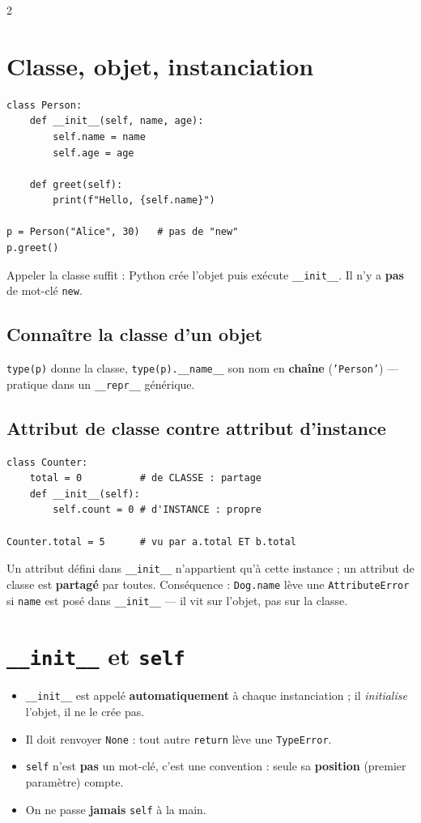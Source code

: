 \documentclass[a4paper,10pt]{article}
\newcommand{\co}[1]{\texttt{\textcolor{codefg}{#1}}}
\begin{document}
\begin{multicols}{2}
\section{Classe, objet, instanciation}

\begin{lstlisting}
class Person:
    def __init__(self, name, age):
        self.name = name
        self.age = age

    def greet(self):
        print(f"Hello, {self.name}")

p = Person("Alice", 30)   # pas de "new"
p.greet()
\end{lstlisting}

Appeler la classe suffit : Python crée l'objet puis exécute
\co{\_\_init\_\_}. Il n'y a \textbf{pas} de mot-clé \co{new}.

\subsection{Connaître la classe d'un objet}
\co{type(p)} donne la classe, \co{type(p).\_\_name\_\_} son nom en
\textbf{chaîne} (\co{'Person'}) --- pratique dans un \co{\_\_repr\_\_}
générique.

\subsection{Attribut de classe contre attribut d'instance}
\begin{lstlisting}
class Counter:
    total = 0          # de CLASSE : partage
    def __init__(self):
        self.count = 0 # d'INSTANCE : propre

Counter.total = 5      # vu par a.total ET b.total
\end{lstlisting}
Un attribut défini dans \co{\_\_init\_\_} n'appartient qu'à cette instance ;
un attribut de classe est \textbf{partagé} par toutes. Conséquence :
\co{Dog.name} lève une \co{AttributeError} si \co{name} est posé dans
\co{\_\_init\_\_} --- il vit sur l'objet, pas sur la classe.

\section{\co{\_\_init\_\_} et \co{self}}

\begin{itemize}
  \item \co{\_\_init\_\_} est appelé \textbf{automatiquement} à chaque
        instanciation ; il \emph{initialise} l'objet, il ne le crée pas.
  \item Il doit renvoyer \co{None} : tout autre \co{return} lève une
        \co{TypeError}.
  \item \co{self} n'est \textbf{pas} un mot-clé, c'est une convention :
        seule sa \textbf{position} (premier paramètre) compte.
  \item On ne passe \textbf{jamais} \co{self} à la main.
\end{itemize}


\end{multicols}
\end{document}
